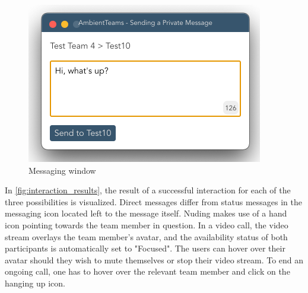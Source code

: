 \begin{figure}[h]
    \centering
    \includegraphics[width=.4\linewidth]{./images/messaging_window.png}
    \caption{Messaging window }
    \label{fig:messaging_window}
\end{figure}

In \autoref{fig:interaction_results}, the result of a successful interaction for each of the three possibilities is visualized. Direct messages differ from status messages in the messaging icon located left to the message itself. Nuding makes use of a hand icon pointing towards the team member in question. In a video call, the video stream overlays the team member's avatar, and the availability status of both participants is automatically set to "Focused". The users can hover over their avatar should they wish to mute themselves or stop their video stream. To end an ongoing call, one has to hover over the relevant team member and click on the hanging up icon.

